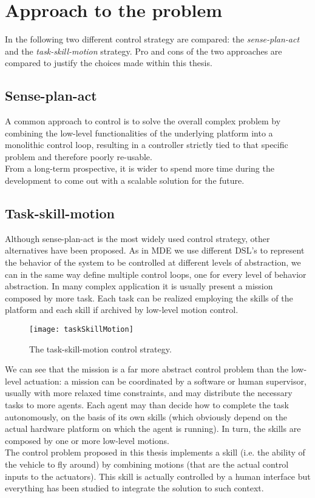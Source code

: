 \chapter{Approach to the problem}
\label{ch:sense-plan-act}
In the following two different control strategy are compared: the \emph{sense-plan-act} and the \emph{task-skill-motion} strategy. Pro and cons of the two approaches are compared to justify the choices made within this thesis.

\section{Sense-plan-act}
A common approach to control is to solve the overall complex problem by combining the low-level functionalities of the underlying platform into a monolithic control loop, resulting in a controller strictly tied to that specific problem and therefore poorly re-usable.\\
From a long-term prospective, it is wider to spend more time during the development to come out with a scalable solution for the future.

\section{Task-skill-motion}
Although sense-plan-act is the most widely used control strategy, other alternatives have been proposed. As in MDE we use different DSL's to represent the behavior of the system to be controlled at different levels of abstraction, we can in the same way define multiple control loops, one for every level of behavior abstraction. In many complex application it is usually present a mission composed by more task. Each task can be realized employing the skills of the platform and each skill if archived by low-level motion control.\\
\begin{wrapfigure}{r}{0.5\textwidth} %
	\texttt{[image: taskSkillMotion]}
	\caption{The task-skill-motion control strategy.}
	\label{fig:taskSkillMotion}
\end{wrapfigure}
We can see that the mission is a far more abstract control problem than the low-level actuation: a mission can be coordinated by a software or human supervisor, usually with more relaxed time constraints, and may distribute the necessary tasks to more agents. Each agent may than decide how to complete the task autonomously, on the basis of its own skills (which obviously depend on the actual hardware platform on which the agent is running). In turn, the skills are composed by one or more low-level motions.\\
The control problem proposed in this thesis implements a skill (i.e. the ability of the vehicle to fly around) by combining motions (that are the actual control inputs to the actuators). This skill is actually controlled by a human interface but everything has been studied to integrate the solution to such context.
